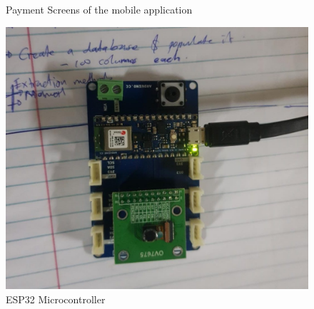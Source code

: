 \begin{figure}
    \caption{Payment Screens of the mobile application}%
    \label{fig:example1}%
\end{figure}

\begin{figure}
    \begin{center}
        \includegraphics[scale = 0.5]{images/esp32.jpeg}
        \caption{ESP32 Microcontroller}
    \end{center}
\end{figure}
